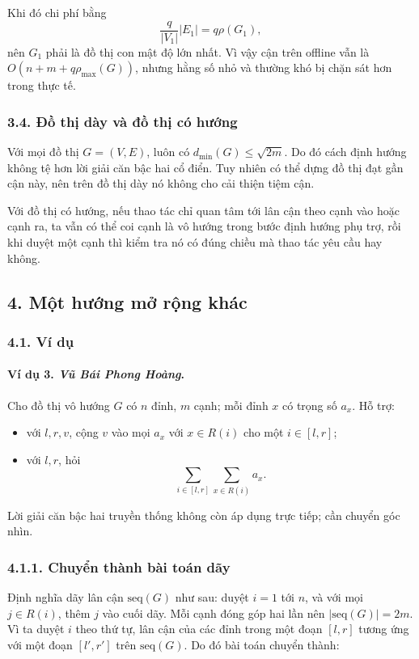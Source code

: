 \documentclass[11pt]{article}
\begin{document}
Khi đó chi phí bằng
\[
  \frac q{|V_1|}|E_1|=q\rho(G_1),
\]
nên \(G_1\) phải là đồ thị con mật độ lớn nhất. Vì vậy cận trên offline vẫn là
\(O(n+m+q\rho_{\max}(G))\), nhưng hằng số nhỏ và thường khó bị chặn sát hơn
trong thực tế.

\subsubsection*{3.4. Đồ thị dày và đồ thị có hướng}

Với mọi đồ thị \(G=(V,E)\), luôn có \(d_{\min}(G)\le\sqrt{2m}\). Do đó cách
định hướng không tệ hơn lời giải căn bậc hai cổ điển. Tuy nhiên có thể dựng
đồ thị đạt gần cận này, nên trên đồ thị dày nó không cho cải thiện tiệm cận.

Với đồ thị có hướng, nếu thao tác chỉ quan tâm tới lân cận theo cạnh vào hoặc
cạnh ra, ta vẫn có thể coi cạnh là vô hướng trong bước định hướng phụ trợ, rồi
khi duyệt một cạnh thì kiểm tra nó có đúng chiều mà thao tác yêu cầu hay không.

\subsection*{4. Một hướng mở rộng khác}

\subsubsection*{4.1. Ví dụ}

\paragraph{Ví dụ 3. \emph{Vũ Bái Phong Hoàng}.}
Cho đồ thị vô hướng \(G\) có \(n\) đỉnh, \(m\) cạnh; mỗi đỉnh \(x\) có trọng số
\(a_x\). Hỗ trợ:
\begin{itemize}
  \item với \(l,r,v\), cộng \(v\) vào mọi \(a_x\) với \(x\in R(i)\) cho một
  \(i\in[l,r]\);
  \item với \(l,r\), hỏi
  \[
    \sum_{i\in[l,r]}\sum_{x\in R(i)}a_x.
  \]
\end{itemize}
Lời giải căn bậc hai truyền thống không còn áp dụng trực tiếp; cần chuyển góc
nhìn.

\subsubsection*{4.1.1. Chuyển thành bài toán dãy}

Định nghĩa dãy lân cận \(\mathrm{seq}(G)\) như sau: duyệt \(i=1\) tới \(n\), và
với mọi \(j\in R(i)\), thêm \(j\) vào cuối dãy. Mỗi cạnh đóng góp hai lần nên
\(|\mathrm{seq}(G)|=2m\). Vì ta duyệt \(i\) theo thứ tự, lân cận của các đỉnh
trong một đoạn \([l,r]\) tương ứng với một đoạn \([l',r']\) trên
\(\mathrm{seq}(G)\). Do đó bài toán chuyển thành:
\end{document}
